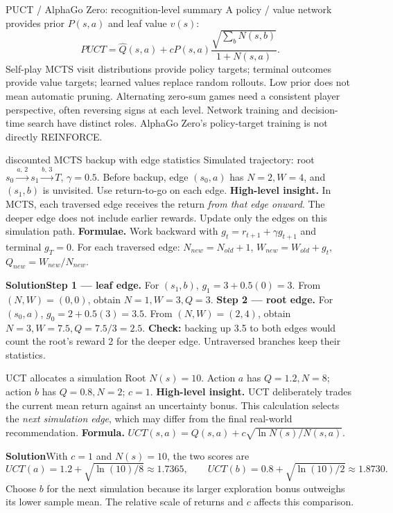 \documentclass[10pt,a4paper]{article}
\newcommand{\ans}{\par\smallskip\textbf{\color{good}Solution\quad}}
\begin{document}
\begin{card}{PUCT / AlphaGo Zero: recognition-level summary}
A policy / value network provides prior $P(s,a)$ and leaf value $v(s)$:
\[
PUCT=\hat Q(s,a)+cP(s,a)\frac{\sqrt{\sum_bN(s,b)}}{1+N(s,a)}.
\]
Self-play MCTS visit distributions provide policy targets; terminal outcomes provide value targets; learned values replace random rollouts. Low prior does not mean automatic pruning. Alternating zero-sum games need a consistent player perspective, often reversing signs at each level.
Network training and decision-time search have distinct roles. AlphaGo Zero's policy-target training is not directly REINFORCE.
\end{card}

\begin{question}{discounted MCTS backup with edge statistics}
Simulated trajectory: root $s_0\xrightarrow{a,\,2}s_1\xrightarrow{b,\,3}T$, $\gamma=0.5$. Before backup, edge $(s_0,a)$ has $N=2,W=4$, and $(s_1,b)$ is unvisited. Use return-to-go on each edge.
\textbf{High-level insight.} In MCTS, each traversed edge receives the return \emph{from that edge onward}. The deeper edge does not include earlier rewards. Update only the edges on this simulation path.
\textbf{Formulae.} Work backward with $g_t=r_{t+1}+\gamma g_{t+1}$ and terminal $g_T=0$. For each traversed edge: $N_{new}=N_{old}+1$, $W_{new}=W_{old}+g_t$, $Q_{new}=W_{new}/N_{new}$.
\ans \textbf{Step 1 --- leaf edge.} For $(s_1,b)$, $g_1=3+0.5(0)=3$. From $(N,W)=(0,0)$, obtain $N=1,W=3,Q=3$.
\textbf{Step 2 --- root edge.} For $(s_0,a)$, $g_0=2+0.5(3)=3.5$. From $(N,W)=(2,4)$, obtain $N=3,W=7.5,Q=7.5/3=2.5$.
\textbf{Check:} backing up 3.5 to both edges would count the root's reward 2 for the deeper edge. Untraversed branches keep their statistics.
\end{question}

\begin{question}{UCT allocates a simulation}
Root $N(s)=10$. Action $a$ has $Q=1.2,N=8$; action $b$ has $Q=0.8,N=2$; $c=1$.
\textbf{High-level insight.} UCT deliberately trades the current mean return against an uncertainty bonus. This calculation selects the \emph{next simulation edge}, which may differ from the final real-world recommendation.
\textbf{Formula.} $UCT(s,a)=Q(s,a)+c\sqrt{\ln N(s)/N(s,a)}$.
\ans With $c=1$ and $N(s)=10$, the two scores are
\[
UCT(a)=1.2+\sqrt{\ln(10)/8}\approx1.7365,\qquad
UCT(b)=0.8+\sqrt{\ln(10)/2}\approx1.8730.
\]
Choose $b$ for the next simulation because its larger exploration bonus outweighs its lower sample mean. The relative scale of returns and $c$ affects this comparison.
\end{question}
\end{document}
